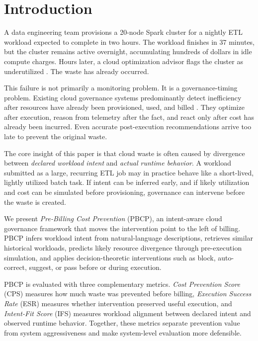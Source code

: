 \section{Introduction}

A data engineering team provisions a 20-node Spark cluster for a nightly ETL workload expected to complete in two hours. The workload finishes in 37 minutes, but the cluster remains active overnight, accumulating hundreds of dollars in idle compute charges. Hours later, a cloud optimization advisor flags the cluster as underutilized \cite{aws-compute-optimizer,azure-advisor,gcp-recommender}. The waste has already occurred.

This failure is not primarily a monitoring problem. It is a governance-timing problem. Existing cloud governance systems predominantly detect inefficiency after resources have already been provisioned, used, and billed \cite{aws-compute-optimizer,azure-advisor,gcp-recommender,notaro2020}. They optimize after execution, reason from telemetry after the fact, and react only after cost has already been incurred. Even accurate post-execution recommendations arrive too late to prevent the original waste.

The core insight of this paper is that cloud waste is often caused by divergence between \emph{declared workload intent} and \emph{actual runtime behavior}. A workload submitted as a large, recurring ETL job may in practice behave like a short-lived, lightly utilized batch task. If intent can be inferred early, and if likely utilization and cost can be simulated before provisioning, governance can intervene before the waste is created.

We present \emph{Pre-Billing Cost Prevention} (PBCP), an intent-aware cloud governance framework that moves the intervention point to the left of billing. PBCP infers workload intent from natural-language descriptions, retrieves similar historical workloads, predicts likely resource divergence through pre-execution simulation, and applies decision-theoretic interventions such as block, auto-correct, suggest, or pass before or during execution.

PBCP is evaluated with three complementary metrics. \emph{Cost Prevention Score}
(CPS) measures how much waste was prevented before billing, \emph{Execution
Success Rate} (ESR) measures whether intervention preserved useful execution,
and \emph{Intent-Fit Score} (IFS) measures workload alignment between declared
intent and observed runtime behavior. Together, these metrics separate
prevention value from system aggressiveness and make system-level evaluation
more defensible.

